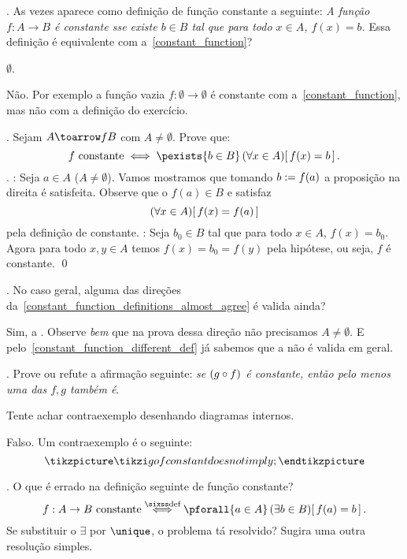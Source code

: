 \exercise.
\label{constant_function_different_def}%
As vezes aparece como definição de função constante a seguinte:
\emph{A função $f : A \to B$ é constante sse existe $b\in B$ tal que
para todo $x \in A$, $f(x) = b$.}
Essa definição é equivalente com a~\ref{constant_function}?

\hint
$\emptyset$.

\solution
Não.
Por exemplo a função vazia $f : \emptyset\to\emptyset$ é constante com
a~\ref{constant_function}, mas não com a definição do exercício.

\endexercise

\proposition.
\label{constant_function_definitions_almost_agree}%
Sejam $A \toarrow f B$ com $A \neq \emptyset$.
Prove que:
$$
\text{$f$ constante}
\iff
\pexists {b\in B}
\lforall {x\in A}
{f(x) = b}.
$$
\proof.
\lrdir:
Seja $a\in A$ ($A\neq\emptyset$).
Vamos mostramos que tomando $b\mathrel{:=} f(a)$ a proposição na direita é satisfeita.
Observe que o $f(a)\in B$ e satisfaz
$$
\left(\/\forall x\in A\right)\!\left[\thinspace f(x) = f(a)\thinspace\right]
$$
pela definição de constante.
\endgraf
\rldir:
Seja $b_0\in B$ tal que para todo $x\in A$, $f(x) = b_0$.
Agora para todo $x,y \in A$ temos $f(x) = b_0 = f(y)$ pela hipótese,
ou seja, $f$ é constante.
\qed

\exercise.
\label{constant_function_which_definition_is_stronger}%
No caso geral, alguma das direções
da~\ref{constant_function_definitions_almost_agree} é valida ainda?

\solution
Sim, a {\rldir}.
Observe \emph{bem} que na prova dessa direção não precisamos $A\neq\emptyset$.
E pelo~\ref{constant_function_different_def} já sabemos que a {\lrdir} não é
valida em geral.

\endexercise

\exercise.
\label{gof_constant_does_not_imply}%
Prove ou refute a afirmação seguinte:
\emph{se $(g\circ f)$ é constante, então pelo menos uma das $f,g$ também é}.

\hint
Tente achar contraexemplo desenhando diagramas internos.

\solution
Falso.
Um contraexemplo é o seguinte:
$$
\tikzpicture
\tikzi gofconstantdoesnotimply;
\endtikzpicture
$$

\endexercise

\exercise.
\label{wrong_order_of_quantifiers}%
O que é errado na definição seguinte de função constante?
$$
\text{$f:A\to B$ constante}
\defiff
\pforall {a \in A}
\lexists {b \in B} {f(a) = b}.
$$
Se substituir o $\exists$ por $\unique$, o problema tá resolvido?
Sugira uma outra resolução simples.

